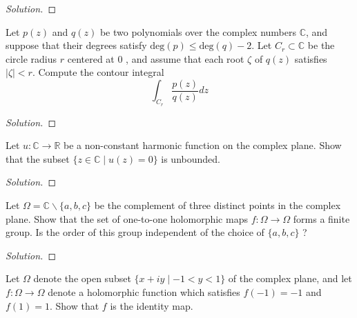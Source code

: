 \documentclass[10pt]{article}
\newenvironment{soln}{\begin{proof}[Solution]}{\end{proof}}
\begin{document}
\begin{soln}

\end{soln}



\begin{problem}
[2009 A-I-1]
Let $p(z)$ and $q(z)$ be two polynomials over the complex numbers $\mathbb{C}$, and suppose that their degrees satisfy $\text{deg}(p) \leq \text{deg}(q)-2$. Let $C_r \subset \mathbb{C}$ be the circle radius $r$ centered at 0 , and assume that each root $\zeta$ of $q(z)$ satisfies $|\zeta|< r$. Compute the contour integral
$$
\int_{C_r} \frac{p(z)}{q(z)} d z
$$
\end{problem}

\begin{soln}

\end{soln}



\begin{problem}
[2009 A-II-1]
Let $u: \mathbb{C} \rightarrow \mathbb{R}$ be a non-constant harmonic function on the complex plane. Show that the subset $\{z \in \mathbb{C} \mid u(z)=0\}$ is unbounded.
\end{problem}

\begin{soln}

\end{soln}



\begin{problem}
[2009 A-II-5]
Let $\Omega=\mathbb{C} \backslash\{a, b, c\}$ be the complement of three distinct points in the complex plane. Show that the set of one-to-one holomorphic maps $f: \Omega \rightarrow \Omega$ forms a finite group. Is the order of this group independent of the choice of $\{a, b, c\}$ ?
\end{problem}

\begin{soln}

\end{soln}



\begin{problem}
[2008 J-I-6]
Let $\Omega$ denote the open subset $\{x+i y \mid-1< y<1\}$ of the complex plane, and let $f: \Omega \longrightarrow \Omega$ denote a holomorphic function which satisfies $f(-1)=-1$ and $f(1)=1$. Show that $f$ is the identity map.
\end{problem}
\end{document}
